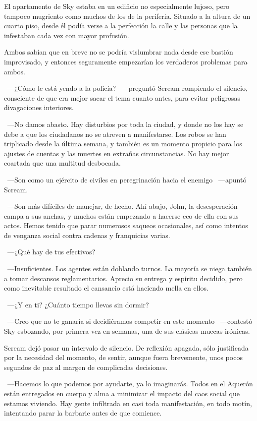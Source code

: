 El apartamento de Sky estaba en un edificio no especialmente lujoso, pero tampoco mugriento como muchos de los de la periferia. Situado a la altura de un cuarto piso, desde él podía verse a la perfección la calle y las personas que la infestaban cada vez con mayor profusión.

Ambos sabían que en breve no se podría vislumbrar nada desde ese bastión improvisado, y entonces seguramente empezarían los verdaderos problemas para ambos.

~---¿Cómo le está yendo a la policía? ~---preguntó Scream rompiendo el silencio, consciente de que era mejor sacar el tema cuanto antes, para evitar peligrosas divagaciones interiores.

~---No damos abasto. Hay disturbios por toda la ciudad, y donde no los hay se debe a que los ciudadanos no se atreven a manifestarse. Los robos se han triplicado desde la última semana, y también es un momento propicio para los ajustes de cuentas y las muertes en extrañas circunstancias. No hay mejor coartada que una multitud desbocada.

~---Son como un ejército de civiles en peregrinación hacia el enemigo ~---apuntó Scream.

~---Son más difíciles de manejar, de hecho. Ahí abajo, John, la desesperación campa a sus anchas, y muchos están empezando a hacerse eco de ella con sus actos. Hemos tenido que parar numerosos saqueos ocasionales, así como intentos de venganza social contra cadenas y franquicias varias.

~---¿Qué hay de tus efectivos?

~---Insuficientes. Los agentes están doblando turnos. La mayoría se niega también a tomar descansos reglamentarios. Aprecio su entrega y espíritu decidido, pero como inevitable resultado el cansancio está haciendo mella en ellos.

~---¿Y en ti? ¿Cuánto tiempo llevas sin dormir?

~---Creo que no te ganaría si decidiéramos competir en este momento ~---contestó Sky esbozando, por primera vez en semanas, una de sus clásicas muecas irónicas.

Scream dejó pasar un intervalo de silencio. De reflexión apagada, sólo justificada por la necesidad del momento, de sentir, aunque fuera brevemente, unos pocos segundos de paz al margen de complicadas decisiones.

~---Hacemos lo que podemos por ayudarte, ya lo imaginarás. Todos en el Aquerón están entregados en cuerpo y alma a minimizar el impacto del caos social que estamos viviendo. Hay gente infiltrada en casi toda manifestación, en todo motín, intentando parar la barbarie antes de que comience.

